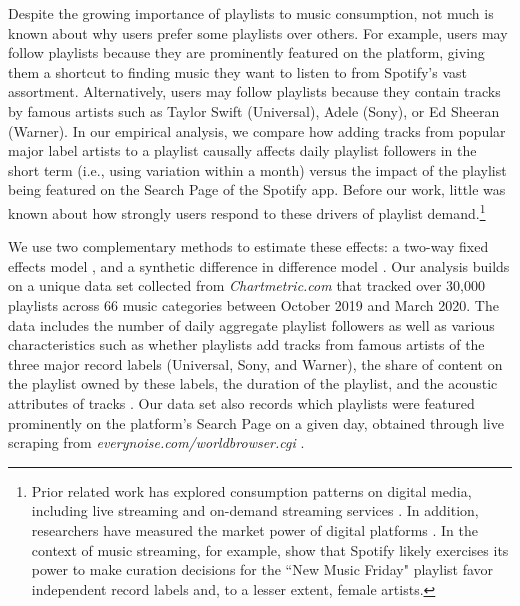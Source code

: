 Despite the growing importance of playlists to music consumption, not much is known about why users prefer some playlists over others. For example, users may follow playlists because they are prominently featured on the platform, giving them a shortcut to finding music they want to listen to from Spotify's vast assortment. Alternatively, users may follow playlists because they contain tracks by famous artists such as Taylor Swift (Universal), Adele (Sony), or Ed Sheeran (Warner). In our empirical analysis, we compare how adding tracks from popular major label artists to a playlist causally affects daily playlist followers in the short term (i.e., using variation within a month) versus the impact of the playlist being featured on the Search Page of the Spotify app. Before our work, little was known about how strongly users respond to these drivers of playlist demand.\footnote{Prior related work has explored consumption patterns on digital media, including live streaming \citep[e.g.,][]{Live_streaming_MKTSCIE_21,jmr_livestreaming} and on-demand streaming services \citep[e.g.,][]{wlomert2023frontiers,Datta_etal_MktScie}. In addition, researchers have measured the market power of digital platforms \citep[e.g.,][]{ review_platform_power_23,economics_two_sided_markets,platform_power_Song_2021}. In the context of music streaming, for example, \cite{playlistbias} show that Spotify likely exercises its power to make curation decisions for the ``New Music Friday" playlist favor independent record labels and, to a lesser extent, female artists.}

We use two complementary methods to estimate these effects: a two-way fixed effects model \citep[e.g.,][]{shapiro_hitsch_tuchman_2021}, and a synthetic difference in difference model  
\citep[e.g.,][]{SDiD_AER_Arkhangelsky_21}. Our analysis builds on a unique data set collected from \textit{Chartmetric.com} that tracked over 30,000 playlists across 66 music categories between October 2019 and March 2020. The data includes the number of daily aggregate playlist followers as well as various characteristics such as whether playlists add tracks from famous artists of the three major record labels (Universal, Sony, and Warner), the share of content on the playlist owned by these labels, the duration of the playlist, and the acoustic attributes of tracks \citep{boughanmiacoustics}. Our data set also records which playlists were featured prominently on the platform's Search Page on a given day, obtained through live scraping from \textit{everynoise.com/worldbrowser.cgi} \citep{scraping}.

